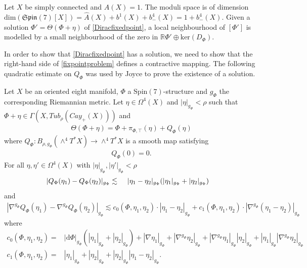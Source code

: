 \documentclass[psamsfonts]{amsart}
\theoremstyle{plain}
\theoremstyle{definition}{
\newtheorem{defi}{Definition}[section]
\newtheorem{ass}{Assumption}
\newtheorem*{nota}{Notation}}
\theoremstyle{remark}{
\newtheorem{rem}{Remark}
\newtheorem{ex}{Example}}
\theoremstyle{plain}{
\newtheorem{thm}{Theorem}[section]
\newtheorem{lem}{Lemma}[section]
\newtheorem{cor}{Corollary}[section]
\newtheorem{prop}{Proposition}[section]
\newtheorem{con}{Conjecture}[section]}
\newcommand{\m}[1]{{\mathrm{#1}}}
\begin{document}
\begin{rem}
    Let $X$ be simply connected and $\hat{A}(X)=1$. The moduli space is of dimension $\m{dim}(\mathfrak{Spin}(7)[X])=\hat{A}(X)+b^1(X)+b^4_-(X)=1+b^4_-(X)$. Given a solution $\Phi'=\Theta(\Phi+\eta)$ of \eqref{Diracfixedpoint}, a local neighbourhood of $[\Phi']$ is modelled by a small neighbourhood of the zero in $\mathbb{R}\Phi'\oplus \m{ker}(D_{\Phi})$.
\end{rem}

In order to show that \eqref{Diracfixedpoint} has a solution, we need to show that the right-hand side of \eqref{fixpointproblem} defines a contractive mapping. The following quadratic estimate on $Q_\Phi$ was used by Joyce to prove the existence of a solution.

\begin{lem}\cite[Lem. 5.1.1]{Joyce1996b}
\label{C1Festimates}
Let $X$ be an oriented eight manifold, $\Phi$ a $\m{Spin}(7)$-structure and $g_{\Phi}$ the corresponding Riemannian metric. Let $\eta\in\Omega^4(X)$ and $|\eta|_{g_{\Phi}}<\rho$ such that $\Phi+\eta\in \Gamma(X,Tub_\rho(Cay_+(X)))$ and 
\begin{align}
\label{taylortheta}
    \Theta(\Phi+\eta)=\Phi+\pi_{\Phi,\top}(\eta)+Q_{\Phi}(\eta)
\end{align}
where $Q_{\Phi}\colon B_{\rho,g_{\Phi}}(\wedge^4T^* X)\rightarrow \wedge^4T^* X$ is a smooth map satisfying 
\begin{align*}
    Q_{\Phi}(0)=0.
\end{align*}
For all $\eta,\eta'\in\Omega^4(X)$ with  $|\eta|_{g_{\Phi}},|\eta'|_{g_{\Phi}}<\rho$ 
\begin{align}
\label{thetaestimate}
\begin{split}
    |Q_{\Phi}(\eta_1)-Q_{\Phi}(\eta_2)|_{g_{\Phi}}\lesssim&\hspace{0.5cm}|\eta_1-\eta_2|_{g_{\Phi}}(|\eta_1|_{g_{\Phi}}+|\eta_2|_{g_{\Phi}})
\end{split}
\end{align}
and
\begin{align}
\label{nablathetaestimate}
    |\nabla^{g_\Phi} Q_{\Phi}(\eta_1)-\nabla^{g_\Phi} Q_{\Phi}(\eta_2)|_{g_{\Phi}}\lesssim c_0(\Phi,\eta_1,\eta_2)\cdot|\eta_1-\eta_2|_{g_{\Phi}}+c_1(\Phi,\eta_1,\eta_2)\cdot|\nabla^{g_\Phi} (\eta_1-\eta_2)|_{g_{\Phi}}
\end{align}
where
\begin{align*}
    c_0(\Phi,\eta_1,\eta_2)=&|\m{d}\Phi|_{g_{\Phi}}(|\eta_1|_{g_{\Phi}}+|\eta_2|_{g_{\Phi}})+|\nabla \eta_1|_{g_{\Phi}}+|\nabla^{g_\Phi} \eta_2|_{g_{\Phi}}+|\nabla^{g_\Phi} \eta_1|_{g_{\Phi}}|\eta_2|_{g_{\Phi}}+|\eta_1|_{g_{\Phi}}|\nabla^{g_\Phi}\eta_2|_{g_{\Phi}}\\
    c_1(\Phi,\eta_1,\eta_2)=&|\eta_1|_{g_{\Phi}}+|\eta_2|_{g_{\Phi}}+|\eta_2|_{g_{\Phi}}|\eta_1-\eta_2|_{g_{\Phi}}.
\end{align*}
\end{lem}
\end{document}

